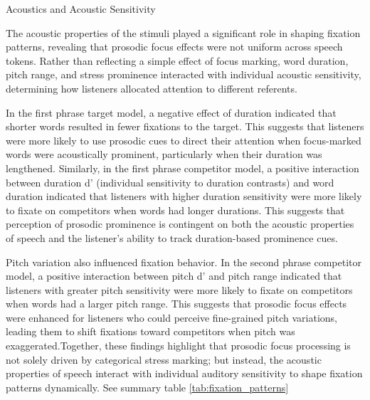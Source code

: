 Acoustics and Acoustic Sensitivity

The acoustic properties of the stimuli played a significant role in shaping fixation patterns, revealing that prosodic focus effects were not uniform across speech tokens. Rather than reflecting a simple effect of focus marking, word duration, pitch range, and stress prominence interacted with individual acoustic sensitivity, determining how listeners allocated attention to different referents.

In the first phrase target model, a negative effect of duration indicated that shorter words resulted in fewer fixations to the target. This suggests that listeners were more likely to use prosodic cues to direct their attention when focus-marked words were acoustically prominent, particularly when their duration was lengthened. Similarly, in the first phrase competitor model, a positive interaction between duration d’ (individual sensitivity to duration contrasts) and word duration indicated that listeners with higher duration sensitivity were more likely to fixate on competitors when words had longer durations. This suggests that perception of prosodic prominence is contingent on both the acoustic properties of speech and the listener’s ability to track duration-based prominence cues.

Pitch variation also influenced fixation behavior. In the second phrase competitor model, a positive interaction between pitch d’ and pitch range  indicated that listeners with greater pitch sensitivity were more likely to fixate on competitors when words had a larger pitch range. This suggests that prosodic focus effects were enhanced for listeners who could perceive fine-grained pitch variations, leading them to shift fixations toward competitors when pitch was exaggerated.Together, these findings highlight that prosodic focus processing is not solely driven by categorical stress marking; but instead, the acoustic properties of speech interact with individual auditory sensitivity to shape fixation patterns dynamically. See summary table \ref{tab:fixation_patterns}

